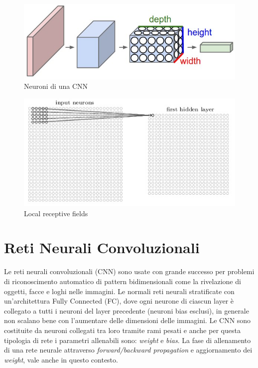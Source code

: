 \documentclass[twoside,twocolumn,10pt]{extarticle}
\theoremstyle{definition}
\begin{document}
\begin{figure}[h]
	\centering
	\includegraphics[scale=.6]{images/cnn.jpeg}
	\caption{Neuroni di una CNN}
	\label{fig:cnn}
\end{figure}

\begin{figure}[h]
	\centering
	\includegraphics[scale=.8]{images/hlayer.jpeg}
	\caption{Local receptive fields}
	\label{fig:hlayer}
\end{figure}

\section{Reti Neurali Convoluzionali}\label{sec:cnn}
Le reti neurali convoluzionali (CNN) sono usate con grande successo per problemi di riconoscimento automatico di pattern bidimensionali come la rivelazione di oggetti, facce e loghi nelle immagini. Le normali reti neurali stratificate con un'architettura Fully Connected (FC), dove ogni neurone di ciascun layer è collegato a tutti i neuroni del layer precedente (neuroni bias esclusi), in generale non scalano bene con l'aumentare delle dimensioni delle immagini. Le CNN sono costituite da neuroni collegati tra loro tramite rami pesati e anche per questa tipologia di rete i parametri allenabili sono: \textit{weight} e \textit{bias}. La fase di allenamento di una rete neurale attraverso \textit{forward/backward propagation} e aggiornamento dei \textit{weight}, vale anche in questo contesto. 
\end{document}

